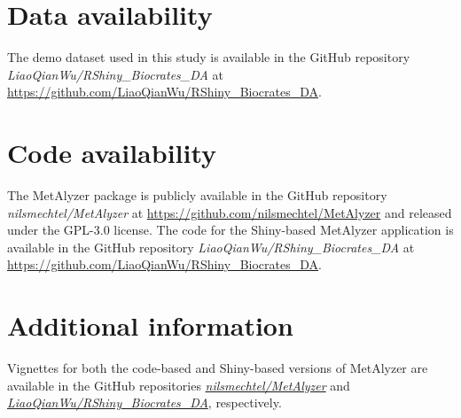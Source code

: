 \documentclass[12pt, a4paper]{article}
\begin{document}
\section*{\large Data availability}
\vspace{-4mm}
The demo dataset used in this study is available in the GitHub repository \textit{LiaoQianWu/RShiny\_Biocrates\_DA} at \url{https://github.com/LiaoQianWu/RShiny_Biocrates_DA}.

\section*{\large Code availability}
\vspace{-4mm}
The MetAlyzer package is publicly available in the GitHub repository \textit{nilsmechtel/MetAlyzer} at \url{https://github.com/nilsmechtel/MetAlyzer} and released under the GPL-3.0 license. The code for the Shiny-based MetAlyzer application is available in the GitHub repository \textit{LiaoQianWu/RShiny\_Biocrates\_DA} at \url{https://github.com/LiaoQianWu/RShiny_Biocrates_DA}.

\section*{\large Additional information}
\vspace{-4mm}
Vignettes for both the code-based and Shiny-based versions of MetAlyzer are available in the GitHub repositories \href{https://github.com/nilsmechtel/MetAlyzer}{\textit{nilsmechtel/MetAlyzer}} and \href{https://github.com/LiaoQianWu/RShiny_Biocrates_DA}{\textit{LiaoQianWu/RShiny\_Biocrates\_DA}}, respectively.


\footnotesize

\end{document}
